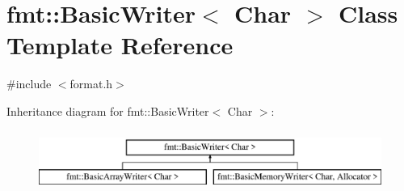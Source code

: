 \hypertarget{classfmt_1_1BasicWriter}{}\section{fmt\+:\+:Basic\+Writer$<$ Char $>$ Class Template Reference}
\label{classfmt_1_1BasicWriter}


{\ttfamily \#include $<$format.\+h$>$}

Inheritance diagram for fmt\+:\+:Basic\+Writer$<$ Char $>$\+:\begin{figure}[H]
\begin{center}
\leavevmode
\includegraphics[height=2.000000cm]{classfmt_1_1BasicWriter}
\end{center}
\end{figure}
